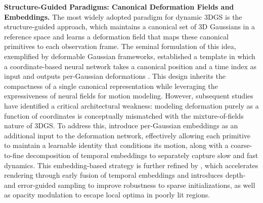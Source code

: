 \documentclass[11pt]{article}
\begin{document}
\textbf{Structure-Guided Paradigms: Canonical Deformation Fields and Embeddings.} The most widely adopted paradigm for dynamic 3DGS is the structure-guided approach, which maintains a canonical set of 3D Gaussians in a reference space and learns a deformation field that maps these canonical primitives to each observation frame. The seminal formulation of this idea, exemplified by deformable Gaussian frameworks, established a template in which a coordinate-based neural network takes a canonical position and a time index as input and outputs per-Gaussian deformations \cite{ref324}. This design inherits the compactness of a single canonical representation while leveraging the expressiveness of neural fields for motion modeling. However, subsequent studies have identified a critical architectural weakness: modeling deformation purely as a function of coordinates is conceptually mismatched with the mixture-of-fields nature of 3DGS. To address this, \cite{ref325} introduce per-Gaussian embeddings as an additional input to the deformation network, effectively allowing each primitive to maintain a learnable identity that conditions its motion, along with a coarse-to-fine decomposition of temporal embeddings to separately capture slow and fast dynamics. This embedding-based strategy is further refined by \cite{ref326}, which accelerates rendering through early fusion of temporal embeddings and introduces depth- and error-guided sampling to improve robustness to sparse initializations, as well as opacity modulation to escape local optima in poorly lit regions.
\end{document}
